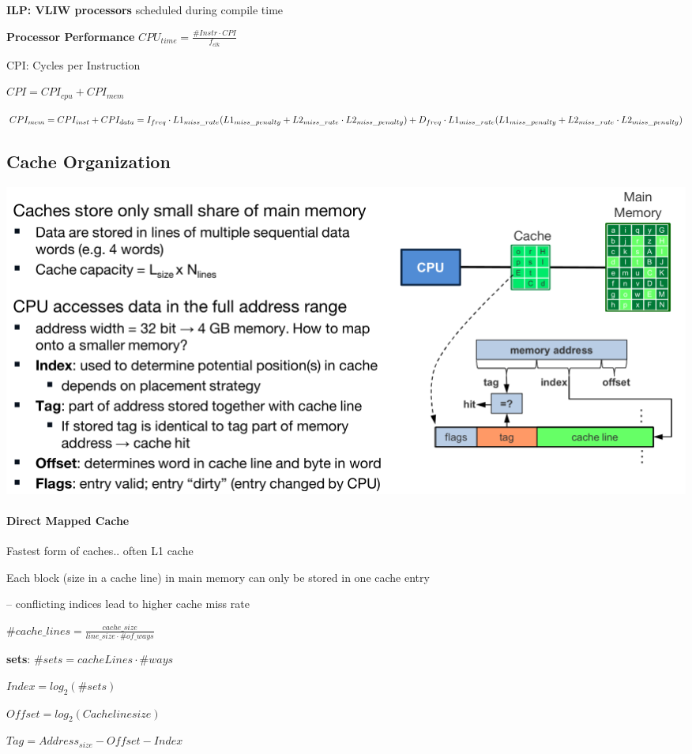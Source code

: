 \documentclass[english]{latex4ei/latex4ei_sheet}
\begin{document}
\textbf{ILP: VLIW processors} scheduled during compile time

\textbf{Processor Performance} $CPU_{time} = \frac{\#Instr \cdot CPI}{f_{clk}}$

CPI: Cycles per Instruction

$CPI = CPI_{cpu} + CPI_{mem}$

$CPI_{mem} = CPI_{inst} + CPI_{data}
	\newline = I_{freq} \cdot L1_{miss\_rate} (L1_{miss\_penalty} + L2_{miss\_rate} \cdot L2_{miss\_penalty}) + D_{freq} \cdot L1_{miss\_rate} (L1_{miss\_penalty} + L2_{miss\_rate} \cdot L2_{miss\_penalty})$

\subsection{Cache Organization}

\begin{center}
	\includegraphics[width = \linewidth]{images/4.ProcessorArchitecture/cache.png}
\end{center}

\paragraph{Direct Mapped Cache} Fastest form of caches.. often L1 cache

Each block (size in a cache line) in main memory can only be stored in one cache entry

-- conflicting indices lead to higher cache miss rate

$\#cache\_lines = \frac{cache\_size}{line\_size \cdot \#of\_ways}$

\textbf{sets}: $\#sets = cacheLines \cdot \#ways$

$Index = log_2(\#sets)$

$Offset = log_2(Cache line size)$

$Tag = Address_{size} - Offset - Index$
\end{document}
